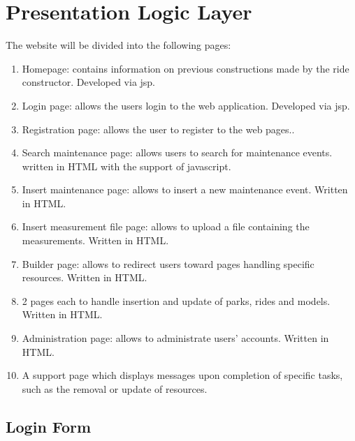 \section{Presentation Logic Layer}
\graphicspath{ {./HW_1/images/} }

The website will be divided into the following pages:
\begin{enumerate}
    \item Homepage: contains information on previous constructions made by the ride constructor. Developed via
jsp.
    \item Login page: allows the users login to the web application. Developed via jsp.
    \item Registration page: allows the user to register to the web pages..
    \item Search maintenance page: allows users to search for maintenance events. written in HTML with the
support of javascript.
    \item Insert maintenance page: allows to insert a new maintenance event. Written in HTML.
    \item Insert measurement file page: allows to upload a file containing the measurements. Written in HTML.
    \item Builder page: allows to redirect users toward pages handling specific resources. Written in HTML.
    \item 2 pages each to handle insertion and update of parks, rides and models. Written in HTML.
    \item Administration page: allows to administrate users’ accounts. Written in HTML.
    \item A support page which displays messages upon completion of specific tasks, such as the removal or update
of resources.
\end{enumerate}

\subsection{Login Form}



















